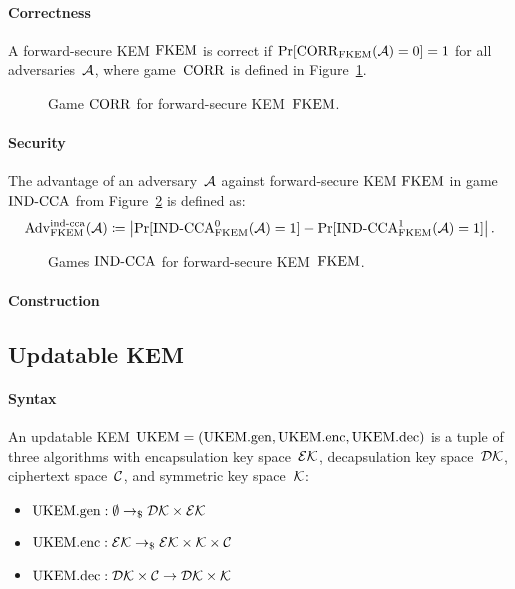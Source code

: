 \documentclass[a4paper,orivec]{llncs}
\begin{document}
\paragraph{Correctness}
A forward-secure KEM $\mathrm{FKEM}$ is correct if $\Pr[\mathrm{CORR}_{\mathrm{FKEM}}(\mathcal{A})=0]=1$ for all adversaries~$\mathcal{A}$, where game~$\mathrm{CORR}$ is defined in Figure~\ref{fig:fkem:corr}.

\begin{figure}[!ht]
    \centering
    \nicoresetlinenr%
    \fbox{%
        \scalebox{\codescalefactor}{%
        }%
    }
    \caption{%
        Game $\mathrm{CORR}$ for forward-secure KEM~$\mathrm{FKEM}$.
    }
    \label{fig:fkem:corr}
\end{figure}

\paragraph{Security}
The advantage of an adversary~$\mathcal{A}$ against forward-secure KEM $\mathrm{FKEM}$ in game ${\mathrm{IND}\text{-}\mathrm{CCA}}$ from Figure~\ref{fig:fkem:ind} is defined as:
\[
\mathrm{Adv}_{\mathrm{FKEM}}^{\mathrm{ind}\text{-}\mathrm{cca}}(\mathcal{A})\coloneqq\left|\Pr[{\mathrm{IND}\text{-}\mathrm{CCA}}_{\mathrm{FKEM}}^0(\mathcal{A})=1]-\Pr[{\mathrm{IND}\text{-}\mathrm{CCA}}_{\mathrm{FKEM}}^1(\mathcal{A})=1]\right|\text{.}
\]

\begin{figure}[!ht]
    \centering
    \nicoresetlinenr%
    \fbox{%
        \scalebox{\codescalefactor}{%
        }%
    }
    \caption{%
        Games ${\mathrm{IND}\text{-}\mathrm{CCA}}$ for forward-secure KEM~$\mathrm{FKEM}$.
    }
    \label{fig:fkem:ind}
\end{figure}

\paragraph{Construction}


\subsection{Updatable KEM}

\paragraph{Syntax}
An updatable KEM $\mathrm{UKEM}=(\mathrm{UKEM}.\mathrm{gen},\mathrm{UKEM}.\mathrm{enc},\mathrm{UKEM}.\mathrm{dec})$ is a tuple of three algorithms with encapsulation key space~$\mathcal{EK}$, decapsulation key space~$\mathcal{DK}$, ciphertext space~$\mathcal{C}$, and symmetric key space~$\mathcal{K}$:

\begin{itemize}
    \item $\mathrm{UKEM}.\mathrm{gen}: \emptyset \to_\$ \mathcal{DK}\times\mathcal{EK}$
    \item $\mathrm{UKEM}.\mathrm{enc}: \mathcal{EK} \to_\$ \mathcal{EK}\times\mathcal{K}\times\mathcal{C}$
    \item $\mathrm{UKEM}.\mathrm{dec}: \mathcal{DK}\times\mathcal{C} \to \mathcal{DK}\times\mathcal{K}$
\end{itemize}
\end{document}
